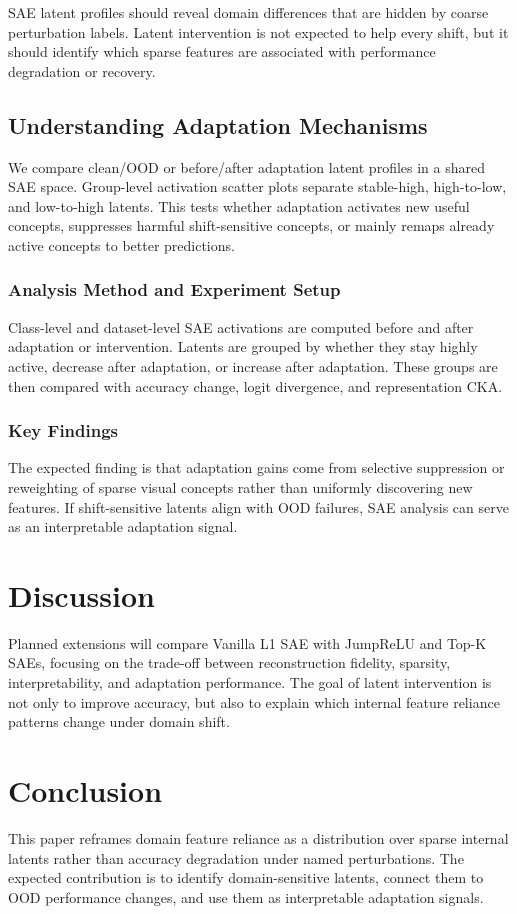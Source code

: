 \documentclass{article}
\begin{document}
SAE latent profiles should reveal domain differences that are hidden by coarse perturbation labels. Latent intervention is not expected to help every shift, but it should identify which sparse features are associated with performance degradation or recovery.

\subsection{Understanding Adaptation Mechanisms}

We compare clean/OOD or before/after adaptation latent profiles in a shared SAE space. Group-level activation scatter plots separate stable-high, high-to-low, and low-to-high latents. This tests whether adaptation activates new useful concepts, suppresses harmful shift-sensitive concepts, or mainly remaps already active concepts to better predictions.

\subsubsection{Analysis Method and Experiment Setup}

Class-level and dataset-level SAE activations are computed before and after adaptation or intervention. Latents are grouped by whether they stay highly active, decrease after adaptation, or increase after adaptation. These groups are then compared with accuracy change, logit divergence, and representation CKA.

\subsubsection{Key Findings}

The expected finding is that adaptation gains come from selective suppression or reweighting of sparse visual concepts rather than uniformly discovering new features. If shift-sensitive latents align with OOD failures, SAE analysis can serve as an interpretable adaptation signal.

\section{Discussion}

Planned extensions will compare Vanilla L1 SAE with JumpReLU and Top-K SAEs, focusing on the trade-off between reconstruction fidelity, sparsity, interpretability, and adaptation performance. The goal of latent intervention is not only to improve accuracy, but also to explain which internal feature reliance patterns change under domain shift.

\section{Conclusion}

This paper reframes domain feature reliance as a distribution over sparse internal latents rather than accuracy degradation under named perturbations. The expected contribution is to identify domain-sensitive latents, connect them to OOD performance changes, and use them as interpretable adaptation signals.



\end{document}
